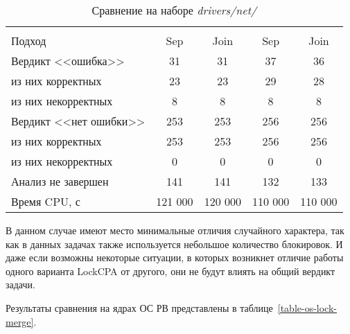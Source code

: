   \begin{table}[h]\footnotesize \centering
    \caption{Сравнение на наборе \textit{drivers/net/}}
  	\label{table-drivers-lock-merge}
    \begin{tabular}{ | l | c | c | c | c | }
      \hline
      		& 		\multicolumn{2}{c|}{\theoryraces} 	& \multicolumn{2}{c|}{\combatmode}  \\
      Подход         				& Sep 		& Join 		& Sep 		& Join   	\\ \hline
      Вердикт <<ошибка>> 				& 31   		& 31   		& 37   		& 36   		\\ 
  \hspace{0.5cm} из них корректных 	& 23 		& 23 		& 29   		& 28     	\\ 
  \hspace{0.5cm} из них некорректных & 8 		& 8 		& 8   		& 8     	\\ \hline
      Вердикт <<нет ошибки>>  		& 253    	& 253   	& 256    	& 256      	\\ 
  \hspace{0.5cm} из них корректных 	& 253 		& 253   	& 256    	& 256     	\\
  \hspace{0.5cm} из них некорректных & 0 		& 0    		& 0     	& 0  		\\ \hline
      Анализ не завершен       		& 141    	& 141   	& 132    	& 133     	\\ \hline
      Время CPU, с   				& 121 000 	& 120 000 	& 110 000 	& 110 000   \\ 
      \hline
    \end{tabular}
  \end{table}

В данном случае имеют место минимальные отличия случайного характера, так как в данных задачах также используется небольшое количество блокировок. 
И даже если возможны некоторые ситуации, в которых возникнет отличие работы одного варианта LockCPA от другого, они не будут влиять на общий вердикт задачи.

Результаты сравнения на ядрах ОС РВ представлены в таблице~\ref{table-os-lock-merge}.

